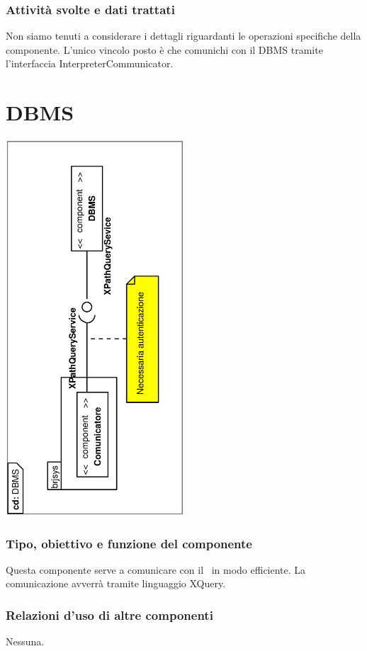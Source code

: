 \documentclass[11pt,titlepage,a4paper]{report}
\begin{document}
\subsubsection{Attivit\`a svolte e dati trattati}
Non siamo tenuti a considerare i dettagli riguardanti le operazioni specifiche della componente. L'unico vincolo posto \`e che comunichi con il DBMS tramite l'interfaccia InterpreterCommunicator.
\section{DBMS}
\begin{center}
 \includegraphics[width=0.5\textwidth, angle=-90]{DiagrammaClassi/DBMS.eps}
\end{center}
\subsubsection{Tipo, obiettivo e funzione del componente}
Questa componente serve a comunicare con il \re\ in modo efficiente. La comunicazione avverr\`a tramite linguaggio XQuery.
\subsubsection{Relazioni d'uso di altre componenti}
Nessuna.
\end{document}
